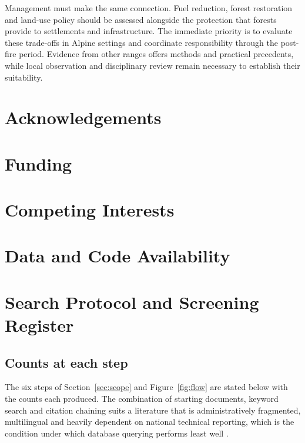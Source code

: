 \documentclass[11pt,a4paper]{article}
\begin{document}
Management must make the same connection. Fuel reduction, forest restoration and land-use policy should be assessed alongside the protection that forests provide to settlements and infrastructure. The immediate priority is to evaluate these trade-offs in Alpine settings and coordinate responsibility through the post-fire period. Evidence from other ranges offers methods and practical precedents, while local observation and disciplinary review remain necessary to establish their suitability.


\section*{Acknowledgements}

\section*{Funding}

\section*{Competing Interests}

\section*{Data and Code Availability}


\appendix

\section{Search Protocol and Screening Register}
\label{app:protocol}

\subsection{Counts at each step}

The six steps of Section~\ref{sec:scope} and Figure~\ref{fig:flow} are stated below with the counts each produced. The combination of starting documents, keyword search and citation chaining suits a literature that is administratively fragmented, multilingual and heavily dependent on national technical reporting, which is the condition under which database querying performs least well \citep{mantero_influence_2020}.
\end{document}
